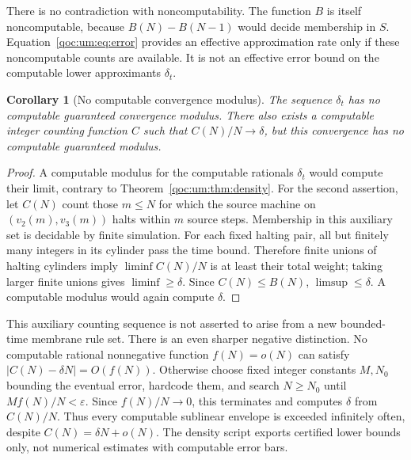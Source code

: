 \documentclass[11pt,letterpaper]{article}
\newtheorem{corollary}[theorem]{Corollary}
\theoremstyle{definition}
\theoremstyle{remark}
\begin{document}
There is no contradiction with noncomputability. The function $B$ is itself noncomputable, because $B(N)-B(N-1)$ would decide membership in $S$. Equation~\eqref{qoc:um:eq:error} provides an effective approximation rate only if these noncomputable counts are available. It is not an effective error bound on the computable lower approximants $\delta_t$.

\begin{corollary}[No computable convergence modulus]
The sequence $\delta_t$ has no computable guaranteed convergence modulus. There also exists a computable integer counting function $C$ such that $C(N)/N\to\delta$, but this convergence has no computable guaranteed modulus.
\end{corollary}
\begin{proof}
A computable modulus for the computable rationals $\delta_t$ would compute their limit, contrary to Theorem~\ref{qoc:um:thm:density}. For the second assertion, let $C(N)$ count those $m\leq N$ for which the source machine on $(v_2(m),v_3(m))$ halts within $m$ source steps. Membership in this auxiliary set is decidable by finite simulation. For each fixed halting pair, all but finitely many integers in its cylinder pass the time bound. Therefore finite unions of halting cylinders imply $\liminf C(N)/N$ is at least their total weight; taking larger finite unions gives $\liminf\geq\delta$. Since $C(N)\leq B(N)$, $\limsup\leq\delta$. A computable modulus would again compute $\delta$.
\end{proof}
This auxiliary counting sequence is not asserted to arise from a new bounded-time membrane rule set. There is an even sharper negative distinction. No computable rational nonnegative function $f(N)=o(N)$ can satisfy $|C(N)-\delta N|=O(f(N))$. Otherwise choose fixed integer constants $M,N_0$ bounding the eventual error, hardcode them, and search $N\geq N_0$ until $Mf(N)/N<\varepsilon$. Since $f(N)/N\to0$, this terminates and computes $\delta$ from $C(N)/N$. Thus every computable sublinear envelope is exceeded infinitely often, despite $C(N)=\delta N+o(N)$. The density script exports certified lower bounds only, not numerical estimates with computable error bars.
\end{document}
